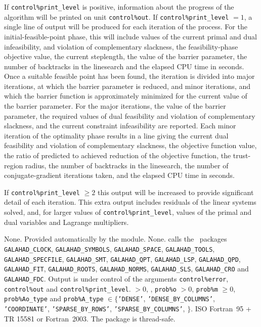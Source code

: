 \documentclass{galahad}
\newcommand{\packagename}{BLLSB}
\begin{document}

\galinfo
If {\tt control\%print\_level} is positive, information about the progress
of the algorithm will be printed on unit {\tt control\-\%out}.
If {\tt control\%print\_level} $= 1$, a single line of output will be produced
for each iteration of the process.
For the initial-feasible-point phase,
this will include values of the current primal and dual infeasibility, and
violation of complementary slackness, the feasibility-phase objective value,
the current steplength, the value of the barrier parameter, the
number of backtracks in the linesearch and the elapsed CPU time in seconds.
Once a suitable feasible point has been found, the iteration is divided
into major iterations, at which the barrier parameter is reduced, and
minor iterations, and which the barrier function is approximately minimized
for the current value of the barrier parameter. For the major iterations,
the value of the barrier parameter, the required values of
dual feasibility and violation of complementary slackness, and the current
constraint infeasibility are reported. Each minor iteration of the
optimality phase results in a line giving
the current dual feasibility and violation of complementary slackness, the
objective function value, the ratio of predicted to achieved reduction
of the objective function, the trust-region radius, the
number of backtracks in the linesearch, the number of conjugate-gradient
iterations taken, and the elapsed CPU time in seconds.

If {\tt control\%print\_level} $\geq 2$ this
output will be increased to provide significant detail of each iteration.
This extra output includes residuals of the linear systems solved, and,
for larger values of {\tt control\%print\_level}, values of the primal and dual
variables and Lagrange multipliers.


\galgeneral

\galcommon None.
\galworkspace Provided automatically by the module.
\galroutines None.
\galmodules {\tt \packagename\_solve} calls the \galahad\ packages
{\tt GALAHAD\_CLOCK},
{\tt GALAHAD\_SY\-M\-BOLS},
{\tt GALA\-HAD\_SPACE},
{\tt GAL\-AHAD\_TOOLS},
{\tt GALAHAD\_SPECFILE},
{\tt GALAHAD\_SMT},
{\tt GALAHAD\_QPT},
{\tt GALAHAD\_LSP},
{\tt GALAHAD\_QPD},
{\tt GALAHAD\_FIT},
{\tt GALAHAD\_ROOTS},
{\tt GALAHAD\_NORMS},
{\tt GALAHAD\_SLS},
{\tt GALAHAD\_CRO}
and
{\tt GAL\-AHAD\_FDC}.
\galio Output is under control of the arguments
 {\tt control\%error}, {\tt control\%out} and {\tt control\%print\_level}.
 $> 0$, , {\tt prob\%o} $> 0$,
{\tt prob\%m} $\geq  0$,
{\tt prob\%Ao\_type} and {\tt prob\%A\_type} $\in \{${\tt 'DENSE'},
 {\tt 'DENSE\_BY\_COLUMNS'},  {\tt 'COORDINATE'},
{\tt 'SPARSE\_BY\_\-ROWS'}, {\tt 'SPARSE\_BY\_\-COLUMNS'},
$\}$.
\galportability ISO Fortran~95 + TR 15581 or Fortran~2003.
The package is thread-safe.
\end{document}

